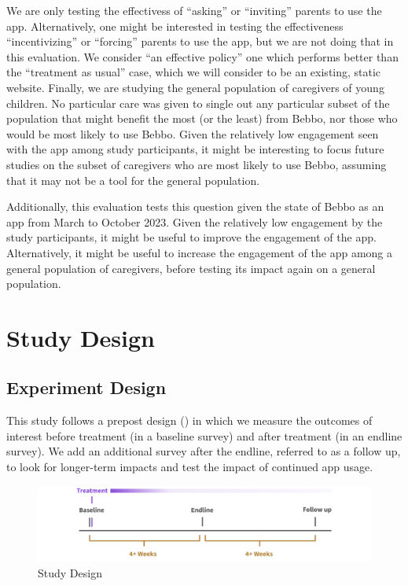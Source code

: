 \documentclass{article}
\begin{document}
We are only testing the effectivess of ``asking'' or ``inviting'' parents to use the app. Alternatively, one might be interested in testing the effectiveness ``incentivizing'' or ``forcing'' parents to use the app, but we are not doing that in this evaluation. We consider ``an effective policy'' one which performs better than the ``treatment as usual'' case, which we will consider to be an existing, static website. Finally, we are studying the general population of caregivers of young children. No particular care was given to single out any particular subset of the population that might benefit the most (or the least) from Bebbo, nor those who would be most likely to use Bebbo. Given the relatively low engagement seen with the app among study participants, it might be interesting to focus future studies on the subset of caregivers who are most likely to use Bebbo, assuming that it may not be a tool for the general population. 

Additionally, this evaluation tests this question given the state of Bebbo as an app from March to October 2023. Given the relatively low engagement by the study participants, it might be useful to improve the engagement of the app. 
Alternatively, it might be useful to increase the engagement of the app among a general population of caregivers, before testing its impact again on a general population.


\section{Study Design}

\subsection*{Experiment Design}

This study follows a prepost design (\cite{Clifford2021}) in which we measure the outcomes of interest before treatment (in a baseline survey) and after treatment (in an endline survey). We add an additional survey after the endline, referred to as a follow up, to look for longer-term impacts and test the impact of continued app usage.


\begin{figure}[H]
\includegraphics[width=\textwidth]{images/design-timeline.png}
\caption{Study Design}
\label{fig:Study Design}
\end{figure}
\end{document}

